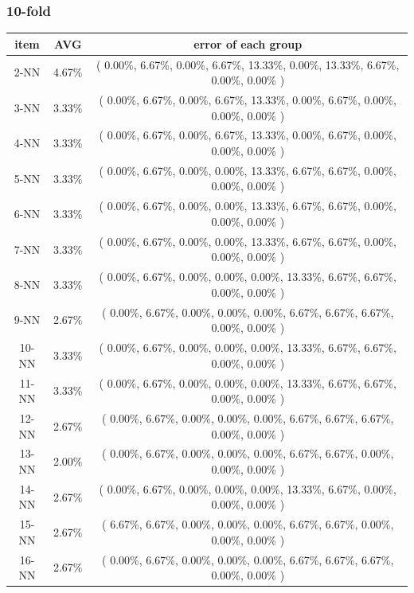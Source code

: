 \documentclass[11pt,a4paper]{article}
\begin{document}
\hypertarget{tenFoldResultunNorm}{}
\subsubsection{10-fold}
\begin{center}
    \begin{tabular} {|| c | c | c ||}
        \hline
        item  & AVG & error of each group \\ \hline
2-NN & 4.67\% & ( 0.00\%, 6.67\%, 0.00\%, 6.67\%, 13.33\%, 0.00\%, 13.33\%, 6.67\%, 0.00\%, 0.00\% )\\ \hline
3-NN & 3.33\% & ( 0.00\%, 6.67\%, 0.00\%, 6.67\%, 13.33\%, 0.00\%, 6.67\%, 0.00\%, 0.00\%, 0.00\% )\\ \hline
4-NN & 3.33\% & ( 0.00\%, 6.67\%, 0.00\%, 6.67\%, 13.33\%, 0.00\%, 6.67\%, 0.00\%, 0.00\%, 0.00\% )\\ \hline
5-NN & 3.33\% & ( 0.00\%, 6.67\%, 0.00\%, 0.00\%, 13.33\%, 6.67\%, 6.67\%, 0.00\%, 0.00\%, 0.00\% )\\ \hline
6-NN & 3.33\% & ( 0.00\%, 6.67\%, 0.00\%, 0.00\%, 13.33\%, 6.67\%, 6.67\%, 0.00\%, 0.00\%, 0.00\% )\\ \hline
7-NN & 3.33\% & ( 0.00\%, 6.67\%, 0.00\%, 0.00\%, 13.33\%, 6.67\%, 6.67\%, 0.00\%, 0.00\%, 0.00\% )\\ \hline
8-NN & 3.33\% & ( 0.00\%, 6.67\%, 0.00\%, 0.00\%, 0.00\%, 13.33\%, 6.67\%, 6.67\%, 0.00\%, 0.00\% )\\ \hline
9-NN & 2.67\% & ( 0.00\%, 6.67\%, 0.00\%, 0.00\%, 0.00\%, 6.67\%, 6.67\%, 6.67\%, 0.00\%, 0.00\% )\\ \hline
10-NN & 3.33\% & ( 0.00\%, 6.67\%, 0.00\%, 0.00\%, 0.00\%, 13.33\%, 6.67\%, 6.67\%, 0.00\%, 0.00\% )\\ \hline
11-NN & 3.33\% & ( 0.00\%, 6.67\%, 0.00\%, 0.00\%, 0.00\%, 13.33\%, 6.67\%, 6.67\%, 0.00\%, 0.00\% )\\ \hline
12-NN & 2.67\% & ( 0.00\%, 6.67\%, 0.00\%, 0.00\%, 0.00\%, 6.67\%, 6.67\%, 6.67\%, 0.00\%, 0.00\% )\\ \hline
13-NN & 2.00\% & ( 0.00\%, 6.67\%, 0.00\%, 0.00\%, 0.00\%, 6.67\%, 6.67\%, 0.00\%, 0.00\%, 0.00\% )\\ \hline
14-NN & 2.67\% & ( 0.00\%, 6.67\%, 0.00\%, 0.00\%, 0.00\%, 13.33\%, 6.67\%, 0.00\%, 0.00\%, 0.00\% )\\ \hline
15-NN & 2.67\% & ( 6.67\%, 6.67\%, 0.00\%, 0.00\%, 0.00\%, 6.67\%, 6.67\%, 0.00\%, 0.00\%, 0.00\% )\\ \hline
16-NN & 2.67\% & ( 0.00\%, 6.67\%, 0.00\%, 0.00\%, 0.00\%, 6.67\%, 6.67\%, 6.67\%, 0.00\%, 0.00\% )\\ \hline

\end{tabular}
\end{center}
\end{document}
